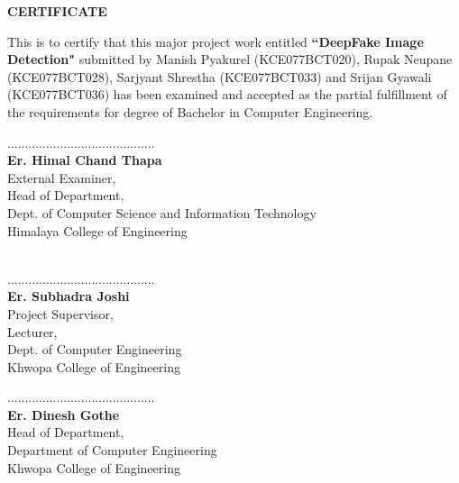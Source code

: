 \begin{center}
	\large{\textbf{CERTIFICATE}}
\end{center}
\vspace{1cm}
This is to certify that this major project work entitled \textbf{``DeepFake Image Detection"} submitted by Manish Pyakurel (KCE077BCT020), Rupak Neupane (KCE077BCT028), Sarjyant Shrestha (KCE077BCT033) and Srijan Gyawali\\(KCE077BCT036) has been examined and accepted as the partial fulfillment of the requirements for degree of Bachelor in Computer Engineering.\\
\vspace{1in}
\begin{multicols}{2}
	\begin{center}
		..........................................\\
		\textbf{Er. Himal Chand Thapa}\\
		External Examiner,\\
    Head of Department,\\
		Dept. of Computer Science and Information Technology\\
		Himalaya College of Engineering\\
		\textbf{}\\
		
	\end{center}

\columnbreak
	\begin{center}
		..........................................\\
		\textbf{Er. Subhadra Joshi}\\
		Project Supervisor,\\
    Lecturer,\\
    Dept. of Computer Engineering\\
    Khwopa College of Engineering
	\end{center}
\end{multicols}
\vspace{1in}
\begin{center}
	..........................................\\
	\textbf{Er. Dinesh Gothe}\\
	Head of Department,\\
	Department of Computer Engineering\\
	Khwopa College of Engineering
\end{center}
\pagebreak



